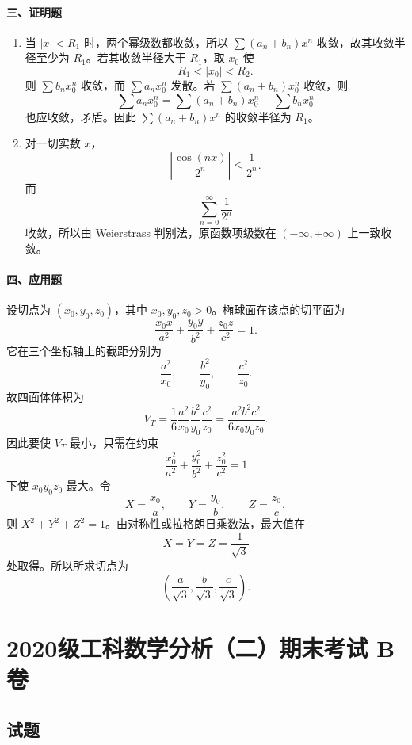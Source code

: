 \paragraph*{三、证明题}
\begin{enumerate}
  \item 当 $|x|<R_1$ 时，两个幂级数都收敛，所以 $\sum(a_n+b_n)x^n$ 收敛，故其收敛半径至少为 $R_1$。若其收敛半径大于 $R_1$，取 $x_0$ 使
  \[
    R_1<|x_0|<R_2.
  \]
  则 $\sum b_nx_0^n$ 收敛，而 $\sum a_nx_0^n$ 发散。若 $\sum(a_n+b_n)x_0^n$ 收敛，则
  \[
    \sum a_nx_0^n=\sum(a_n+b_n)x_0^n-\sum b_nx_0^n
  \]
  也应收敛，矛盾。因此 $\sum(a_n+b_n)x^n$ 的收敛半径为 $R_1$。
  \item 对一切实数 $x$，
  \[
    \left|\frac{\cos(nx)}{2^n}\right|\le \frac1{2^n}.
  \]
  而
  \[
    \sum_{n=0}^{\infty}\frac1{2^n}
  \]
  收敛，所以由 Weierstrass 判别法，原函数项级数在 $(-\infty,+\infty)$ 上一致收敛。
\end{enumerate}

\paragraph*{四、应用题}
设切点为 $(x_0,y_0,z_0)$，其中 $x_0,y_0,z_0>0$。椭球面在该点的切平面为
\[
  \frac{x_0x}{a^2}+\frac{y_0y}{b^2}+\frac{z_0z}{c^2}=1.
\]
它在三个坐标轴上的截距分别为
\[
  \frac{a^2}{x_0},\qquad \frac{b^2}{y_0},\qquad \frac{c^2}{z_0}.
\]
故四面体体积为
\[
  V_T=\frac16\frac{a^2}{x_0}\frac{b^2}{y_0}\frac{c^2}{z_0}
  =\frac{a^2b^2c^2}{6x_0y_0z_0}.
\]
因此要使 $V_T$ 最小，只需在约束
\[
  \frac{x_0^2}{a^2}+\frac{y_0^2}{b^2}+\frac{z_0^2}{c^2}=1
\]
下使 $x_0y_0z_0$ 最大。令
\[
  X=\frac{x_0}{a},\qquad Y=\frac{y_0}{b},\qquad Z=\frac{z_0}{c},
\]
则 $X^2+Y^2+Z^2=1$。由对称性或拉格朗日乘数法，最大值在
\[
  X=Y=Z=\frac1{\sqrt3}
\]
处取得。所以所求切点为
\[
  \left(\frac{a}{\sqrt3},\frac{b}{\sqrt3},\frac{c}{\sqrt3}\right).
\]

\section{2020级工科数学分析（二）期末考试 B 卷}

\subsection{试题}

